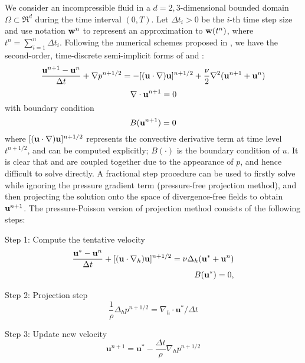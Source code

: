 We consider an incompressible fluid in a $d = 2, 3$-dimensional bounded domain $\Omega \subset \Re^d$ during the time interval $(0, T)$. Let $\Delta t_i > 0$ be the $i$-th time step size and use notation $\mathbf{w}^n$ to represent an approximation to $\mathbf{w}(t^n)$, where $t^n = \sum_{i = 1}^{n}\Delta t_i$. Following the numerical schemes proposed in \cite{}, we have the second-order, time-discrete semi-implicit forms of  and :
\begin{equation}
\frac{\mathbf{u}^{n+1} - \mathbf{u}^n}{\Delta t} + \nabla p^{n+1/2} = 
-[(\mathbf{u}\cdot\nabla)\mathbf{u}]^{n+1/2} + \frac{\nu}{2}\nabla^2(\mathbf{u}^{n+1} + \mathbf{u}^n)
\label{dis_mom_eqn}
\end{equation}
\begin{equation}
\nabla\cdot\mathbf{u}^{n+1} = 0
\label{dis_div_free}
\end{equation}
with boundary condition
\begin{equation}
B(\mathbf{u}^{n+1}) = 0
\label{ns_bc}
\end{equation}
where $[(\mathbf{u}\cdot\nabla)\mathbf{u}]^{n+1/2}$ represents the convective derivative term at time level $t^{n+1/2}$, and can be computed explicitly\cite{KimMoin85}; $B(\cdot)$ is the boundary condition of $u$. It is clear that  and  are coupled together due to the appearance of $p$, and hence difficult to solve directly. A fractional step procedure can be used to firstly solve  while ignoring the pressure gradient term (pressure-free projection method), and then projecting the solution onto the space of divergence-free fields to obtain $\mathbf{u}^{n+1}$. The pressure-Poisson version of projection method consists of the following steps:

Step 1: Compute the tentative velocity
\begin{eqnarray}
\frac{\mathbf{u}^*-\mathbf{u}^n}{\Delta t}+
[(\mathbf{u}\cdot\nabla_h)\mathbf{u}]^{n+1/2}
=\nu\Delta_h(\mathbf{u}^*+\mathbf{u}^n)\\ 
B(\mathbf{u}^*) = 0,
\label{tent_vel}
\end{eqnarray} 

Step 2: Projection step
\begin{equation} \frac{1}{\rho}\Delta_h p^{n+1/2} =
\nabla_h\cdot \mathbf{u}^*/\Delta t 
\label{proj} 
\end{equation}

Step 3: Update new velocity
\begin{equation} \mathbf{u}^{n+1} = \mathbf{u}^* -
\frac{\Delta t}{\rho}\nabla_h p^{n+1/2} \label{newvel} \end{equation}

